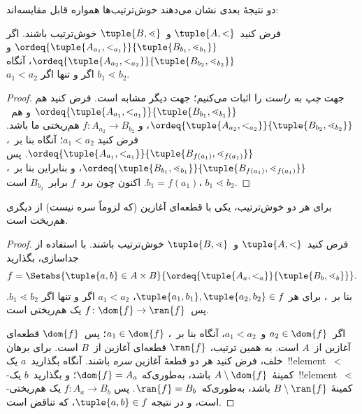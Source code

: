 \documentclass[../../../include/open-logic-section]{subfiles}
\begin{document}
دو نتیجهٔ بعدی نشان می‌دهند خوش‌ترتیب‌ها همواره قابل مقایسه‌اند:

\begin{lem}
فرض کنید~$\tuple{A,<}$ و~$\tuple{B,\lessdot}$ خوش‌ترتیب باشند. اگر
$\ordeq{\tuple{A_{a_1},<_{a_1}}}{\tuple{B_{b_1},\lessdot_{b_1}}}$ و
$\ordeq{\tuple{A_{{a_2}},<_{a_2}}}{\tuple{B_{{b_2}},
\lessdot_{b_2}}}$، آنگاه
${a_1}<{a_2} \text{ اگر و تنها اگر }{b_1}\lessdot{b_2}$.
\end{lem}

\begin{proof}
جهت \emph{چپ به راست} را اثبات می‌کنیم؛ جهت دیگر مشابه است. فرض کنید هم
$\ordeq{\tuple{A_{a_1},<_{a_1}}}{\tuple{B_{b_1},
\lessdot_{b_1}}}$ و هم~$\ordeq{\tuple{A_{{a_2}},
<_{a_2}}}{\tuple{B_{{b_2}},\lessdot_{b_2}}}$، و
$f \colon A_{{a_2}} \to B_{{b_2}}$ هم‌ریختی ما باشد. فرض کنید
${a_1}<{a_2}$؛ آنگاه بنا بر~،
$\ordeq{\tuple{A_{a_1},<_{a_1}}}{\tuple{B_{f({a_1})},
\lessdot_{f({a_1})}}}$. پس
$\ordeq{\tuple{B_{b_1},\lessdot_{b_1}}}{\tuple{B_{f({a_1})},
\lessdot_{f({a_1})}}}$، و بنابراین بنا بر~،
${b_1}=f({a_1})$. اکنون چون برد~$f$ برابر~$B_{{b_2}}$ است،
${b_1}\lessdot{b_2}$.
\end{proof}

\begin{thm}
برای هر دو خوش‌ترتیب، یکی با قطعه‌ای آغازین (که لزوماً سره نیست) از دیگری
هم‌ریخت است.
\end{thm}

\begin{proof}
فرض کنید~$\tuple{A,<}$ و~$\tuple{B,\lessdot}$ خوش‌ترتیب باشند. با استفاده
از جداسازی، بگذارید
\[
	f = \Setabs{\tuple{a,b} \in A \times B}{
		\ordeq{\tuple{A_a,<_a}}{\tuple{B_b,\lessdot_b}}}.
\]
بنا بر~، برای هر
$\tuple{a_1,b_1},\tuple{a_2,b_2}\in f$، $a_1<a_2$ اگر و تنها اگر
$b_1\lessdot b_2$. پس~$f \colon \dom{f} \to \ran{f}$ یک هم‌ریختی است.

اگر~$a_2\in\dom{f}$ و~$a_1<a_2$، آنگاه بنا
بر~، $a_1\in\dom{f}$؛ پس~$\dom{f}$ قطعه‌ای
آغازین از~$A$ است. به همین ترتیب، $\ran{f}$ قطعه‌ای آغازین از~$B$ است.
برای برهان خلف، فرض کنید هر دو قطعهٔ آغازین \emph{سره} باشند. آنگاه
بگذارید~$a$ یک~!!{element}~$<$-کمینهٔ~$A\setminus\dom{f}$ باشد، به‌طوری‌که
$\dom{f}=A_a$؛ و بگذارید~$b$ یک~!!{element}~$\lessdot$-کمینهٔ
$B\setminus\ran{f}$ باشد، به‌طوری‌که~$\ran{f}=B_b$. پس
$f \colon A_a \to B_b$ یک هم‌ریختی است، و در نتیجه
$\tuple{a,b}\in f$، که تناقض است.
\end{proof}
\end{document}

